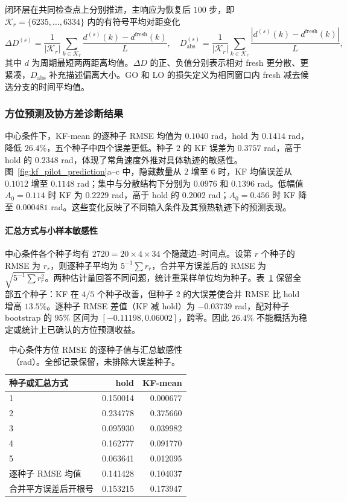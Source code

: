 \documentclass[UTF8,fontset=windows,11pt]{ctexart}
\begin{document}
闭环层在共同检查点上分别推进，主响应为恢复后 $100$ 步，即 $\mathcal K_r=\{6235,\ldots,6334\}$ 内的有符号平均对距变化
\begin{equation}
 \Delta D^{(s)}=\frac{1}{|\mathcal K_r|}\sum_{k\in\mathcal K_r}
 \frac{d^{(s)}(k)-d^{\mathrm{fresh}}(k)}{L},
 \quad
 D_{\mathrm{abs}}^{(s)}=\frac{1}{|\mathcal K_r|}\sum_{k\in\mathcal K_r}
 \frac{|d^{(s)}(k)-d^{\mathrm{fresh}}(k)|}{L},
 \label{eq:pilot_distance_metrics}
\end{equation}
其中 $d$ 为周期最短两两距离均值。$\Delta D$ 的正、负值分别表示相对 fresh 更分散、更紧凑，$D_{\mathrm{abs}}$ 补充描述偏离大小。GO 和 LO 的损失定义为相同窗口内 fresh 减去候选分支的时间平均值。

\subsubsection{方位预测及协方差诊断结果}

中心条件下，KF-mean 的逐种子 RMSE 均值为 $0.1040$ rad，hold 为 $0.1414$ rad，降低 $26.4\%$，五个种子中四个误差更低。种子 $2$ 的 KF 误差为 $0.3757$ rad，高于 hold 的 $0.2348$ rad，体现了常角速度外推对具体轨迹的敏感性。图~\ref{fig:kf_pilot_prediction}a--c 中，隐藏数量从 $2$ 增至 $6$ 时，KF 均值误差从 $0.1012$ 增至 $0.1148$ rad；集中与分散结构下分别为 $0.0976$ 和 $0.1396$ rad。低幅值 $A_0=0.114$ 时 KF 为 $0.2229$ rad，高于 hold 的 $0.2002$ rad；$A_0=0.456$ 时 KF 降至 $0.000481$ rad。这些变化反映了不同输入条件及其预热轨迹下的预测表现。

\paragraph{汇总方式与小样本敏感性}
中心条件各个种子均有 $2720=20\times4\times34$ 个隐藏边--时间点。设第 $r$ 个种子的 RMSE 为 $r_r$，则逐种子平均为 $5^{-1}\sum r_r$，合并平方误差后的 RMSE 为 $\sqrt{5^{-1}\sum r_r^2}$。两种估计量回答不同问题，统计重采样单位均为种子。表~\ref{tab:rmse_sensitivity} 保留全部五个种子：KF 在 $4/5$ 个种子改善，但种子 $2$ 的大误差使合并 RMSE 比 hold 增高 $13.5\%$。逐种子 RMSE 差值（KF 减 hold）为 $-0.03739$ rad，配对种子 bootstrap 的 $95\%$ 区间为 $[-0.11198,0.06002]$，跨零。因此 $26.4\%$ 不能概括为稳定或统计上已确认的方位预测收益。

\begin{table}[!tbp]
\centering\small
\caption{中心条件方位 RMSE 的逐种子值与汇总敏感性（rad）。全部记录保留，未排除大误差种子。}
\label{tab:rmse_sensitivity}
\begin{tabular}{lrr}
\toprule 种子或汇总方式 & hold & KF-mean\\\midrule
1 & 0.150014 & 0.000677\\
2 & 0.234778 & 0.375660\\
3 & 0.095930 & 0.039982\\
4 & 0.162777 & 0.091770\\
5 & 0.063641 & 0.012095\\\midrule
逐种子 RMSE 均值 & 0.141428 & 0.104037\\
合并平方误差后开根号 & 0.153215 & 0.173947\\\bottomrule
\end{tabular}
\end{table}
\end{document}
